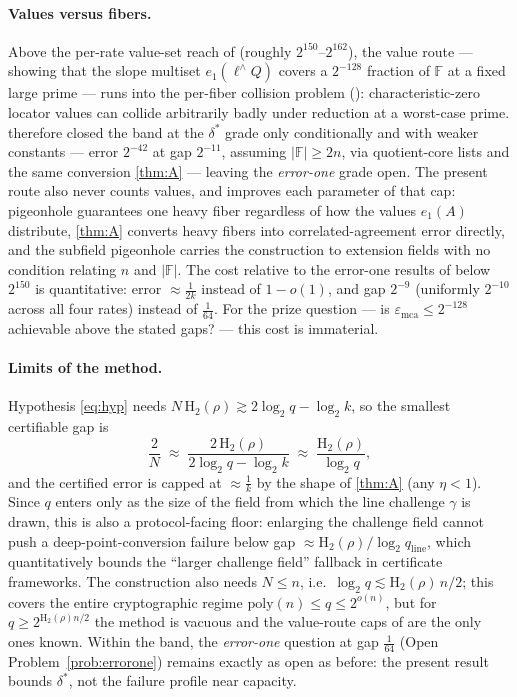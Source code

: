 \documentclass[11pt]{article}
\theoremstyle{definition}
\theoremstyle{remark}
\newcommand{\F}{\mathbb{F}}
\newcommand{\emca}{\varepsilon_{\mathrm{mca}}}
\newcommand{\Hb}{\mathrm{H}_2}
\newcommand{\eone}{e_1}
\begin{document}
\paragraph{Values versus fibers.}
Above the per-rate value-set reach of \cite{Cho26b} (roughly $2^{150}$--$2^{162}$), the value route --- showing that the slope multiset $\eone(\ell^\wedge Q)$ covers a $2^{-128}$ fraction of $\F$ at a fixed large prime --- runs into the per-fiber collision problem (\cite[Rem.\ ``The remaining band'']{Cho26b}): characteristic-zero locator values can collide arbitrarily badly under reduction at a worst-case prime. \cite{Cho26b} therefore closed the band at the $\delta^*$ grade only conditionally and with weaker constants --- error $2^{-42}$ at gap $2^{-11}$, assuming $|\F|\ge2n$, via quotient-core lists and the same conversion \cref{thm:A} --- leaving the \emph{error-one} grade open. The present route also never counts values, and improves each parameter of that cap: pigeonhole guarantees one heavy fiber regardless of how the values $\eone(A)$ distribute, \cref{thm:A} converts heavy fibers into correlated-agreement error directly, and the subfield pigeonhole carries the construction to extension fields with no condition relating $n$ and $|\F|$. The cost relative to the error-one results of \cite{Cho26a,Cho26b} below $2^{150}$ is quantitative: error $\approx\frac1{2k}$ instead of $1-o(1)$, and gap $2^{-9}$ (uniformly $2^{-10}$ across all four rates) instead of $\frac1{64}$. For the prize question --- is $\emca\le2^{-128}$ achievable above the stated gaps? --- this cost is immaterial.

\paragraph{Limits of the method.}
Hypothesis \eqref{eq:hyp} needs $N\,\Hb(\rho)\gtrsim2\log_2q-\log_2k$, so the smallest certifiable gap is
\[
\frac2N\;\approx\;\frac{2\,\Hb(\rho)}{2\log_2q-\log_2k}\;\approx\;\frac{\Hb(\rho)}{\log_2 q},
\]
and the certified error is capped at $\approx\frac1k$ by the shape of \cref{thm:A} (any $\eta<1$). Since $q$ enters only as the size of the field from which the line challenge $\gamma$ is drawn, this is also a protocol-facing floor: enlarging the challenge field cannot push a deep-point-conversion failure below gap $\approx\Hb(\rho)/\log_2 q_{\mathrm{line}}$, which quantitatively bounds the ``larger challenge field'' fallback in certificate frameworks. The construction also needs $N\le n$, i.e.\ $\log_2q\lesssim\Hb(\rho)\,n/2$; this covers the entire cryptographic regime $\mathrm{poly}(n)\le q\le2^{o(n)}$, but for $q\ge2^{\Hb(\rho)n/2}$ the method is vacuous and the value-route caps of \cite{Cho26a,Cho26b} are the only ones known. Within the band, the \emph{error-one} question at gap $\frac1{64}$ (Open Problem~\ref{prob:errorone}) remains exactly as open as before: the present result bounds $\delta^*$, not the failure profile near capacity.
\end{document}
